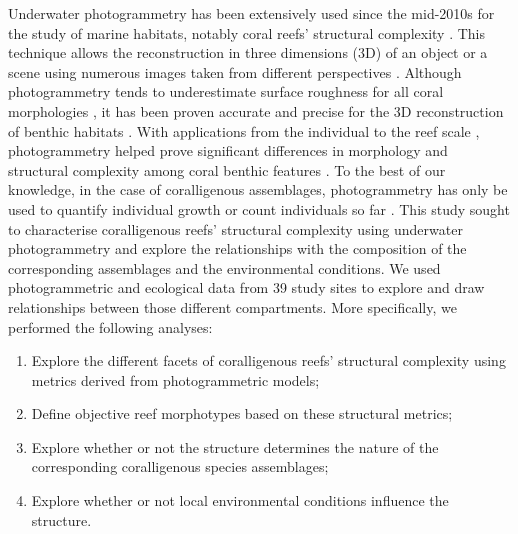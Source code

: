 Underwater photogrammetry has been extensively used since the mid-2010s for the study of marine habitats, notably coral reefs’ structural complexity \citep{bryson_characterization_2017, burns_integrating_2015, burns_utilizing_2015, figueira_accuracy_2015, gutierrez-heredia_simple_2015, leon_measuring_2015}. This technique allows the reconstruction in three dimensions (3D) of an object or a scene using numerous images taken from different perspectives \citep{figueira_accuracy_2015}. Although photogrammetry tends to underestimate surface roughness for all coral morphologies \citep{figueira_accuracy_2015}, it has been proven accurate and precise for the 3D reconstruction of benthic habitats \citep{bryson_characterization_2017, figueira_accuracy_2015, marre_monitoring_2019}. With applications from the individual \citep{zawada_quantifying_2019} to the reef scale  \citep{figueira_accuracy_2015}, photogrammetry helped prove significant differences in morphology and structural complexity among coral benthic features \citep{burns_integrating_2015}. To the best of our knowledge, in the case of coralligenous assemblages, photogrammetry has only be used to quantify individual growth or count individuals so far \citep{palma_sfm-based_2018,palma_effective_2019,royer_photogrammetric_2018}. This study sought to characterise coralligenous reefs’ structural complexity using underwater photogrammetry and explore the relationships with the composition of the corresponding assemblages and the environmental conditions. We used photogrammetric and ecological data from 39 study sites to explore and draw relationships between those different compartments. More specifically, we performed the following analyses:

\begin{enumerate}
    \item Explore the different facets of coralligenous reefs’ structural complexity using metrics derived from photogrammetric models;
    
    \item Define objective reef morphotypes based on these structural metrics;
    
    \item Explore whether or not the structure determines the nature of the corresponding coralligenous species assemblages;
    
    \item Explore whether or not local environmental conditions influence the structure.
\end{enumerate}

